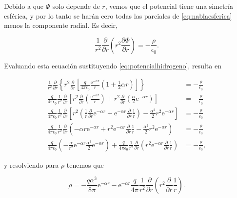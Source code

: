 \documentclass[a4paper,10pt]{article}
\numberwithin{equation}{section}
\newcommand{\euler}{\mathrm{e}}
\begin{document}
Debido a que $\Phi$ solo depende de $r$, vemos que el potencial tiene una simetría 
esférica, y por lo tanto se harán cero todas las parciales de \eqref{eq:nablaesferica} 
menos la componente radial. Es decir, 

\begin{equation}
 \frac{1}{r^2}\frac{\partial}{\partial r}\left(r^2\frac{\partial \Phi}{\partial r}\right) = 
 - \frac{\rho}{\epsilon_0}.
\end{equation}

Evaluando esta ecuación sustituyendo \eqref{eq:potencialhidrogeno}, resulta en 

\begin{align*}
  \frac{1}{r^2}\frac{\partial}{\partial r}
 \left\{r^2\frac{\partial}{\partial r}\left[\frac{q}{4\pi\epsilon_0}
 \frac{\euler^{-\alpha r}}{r}\left(1 + \frac{1}{2}\alpha r\right)\right] \right\} &= 
 - \frac{\rho}{\epsilon_0} \\
 \frac{q}{4\pi\epsilon_0}\frac{1}{r^2}\frac{\partial}{\partial r}
 \left[r^2\frac{\partial}{\partial r}\left(\frac{\euler^{-\alpha r}}{r}\right) 
 + r^2\frac{\partial}{\partial r}\left(\frac{\alpha}{2}\euler^{-\alpha r}\right)
 \right] &= - \frac{\rho}{\epsilon_0} \\
  \frac{q}{4\pi\epsilon_0}\frac{1}{r^2}\frac{\partial}{\partial r}
  \left[r^2\left(\frac{1}{r}\frac{\partial}{\partial r}\euler^{-\alpha r}
  + \euler^{-\alpha r}\frac{\partial}{\partial r}\frac{1}{r}\right)
  - \frac{\alpha^2}{2}r^2\euler^{-\alpha r}\right] &= - \frac{\rho}{\epsilon_0} \\
  \frac{q}{4\pi\epsilon_0}\frac{1}{r^2}\frac{\partial}{\partial r}
  \left(-\alpha r \euler^{-\alpha r} + r^2\euler^{-\alpha r} 
  \frac{\partial}{\partial r}\frac{1}{r} - \frac{\alpha^2}{2}r^2\euler^{-\alpha r}
  \right) &= - \frac{\rho}{\epsilon_0} \\
  \frac{q}{4\pi\epsilon_0}\left(-\frac{\alpha}{r^2}\euler^{-\alpha r} 
  \frac{\alpha^3}{2}\euler^{-\alpha r}\right) + \frac{q}{4\pi\epsilon_0}
  \frac{1}{r^2}\frac{\partial}{\partial r}\left(r^2\euler^{-\alpha r} 
  \frac{\partial}{\partial r}\frac{1}{r}\right) &= - \frac{\rho}{\epsilon_0}, 
\end{align*}

y resolviendo para $\rho$ tenemos que 

\begin{equation}
 \rho = - \frac{q\alpha^3}{8\pi}\euler^{-\alpha r} - 
 \euler^{-\alpha r}\frac{q}{4\pi}\frac{1}{r^2}\frac{\partial}{\partial r}
 \left(r^2\frac{\partial}{\partial r}\frac{1}{r} \right).
 \label{eq:rhohidrogeno1}
\end{equation}
\end{document}
